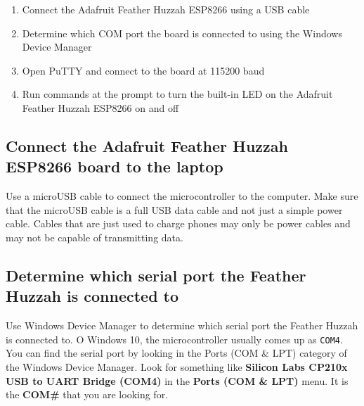 \documentclass{book}
\providecommand{\tightlist}{%
      \setlength{\itemsep}{0pt}\setlength{\parskip}{0pt}}
\begin{document}
    
        \begin{enumerate}
\def\labelenumi{\arabic{enumi}.}
\tightlist
\item
  Connect the Adafruit Feather Huzzah ESP8266 using a USB cable
\item
  Determine which COM port the board is connected to using the Windows
  Device Manager
\item
  Open PuTTY and connect to the board at 115200 baud
\item
  Run commands at the prompt to turn the built-in LED on the Adafruit
  Feather Huzzah ESP8266 on and off
\end{enumerate}
    




    
        \subsection{Connect the Adafruit Feather Huzzah ESP8266 board to the
laptop}\label{connect-the-adafruit-feather-huzzah-esp8266-board-to-the-laptop}
    




    
        Use a microUSB cable to connect the microcontroller to the computer.
Make sure that the microUSB cable is a full USB data cable and not just
a simple power cable. Cables that are just used to charge phones may
only be power cables and may not be capable of transmitting data.
    




    
        \subsection{Determine which serial port the Feather Huzzah is connected
to}\label{determine-which-serial-port-the-feather-huzzah-is-connected-to}
    




    
        Use Windows Device Manager to determine which serial port the Feather
Huzzah is connected to. O Windows 10, the microcontroller usually comes
up as \lstinline!COM4!. You can find the serial port by looking in the
Ports (COM \& LPT) category of the Windows Device Manager. Look for
something like \textbf{Silicon Labs CP210x USB to UART Bridge (COM4)} in
the \textbf{Ports (COM \& LPT)} menu. It is the \textbf{COM\#} that you
are looking for.
\end{document}
